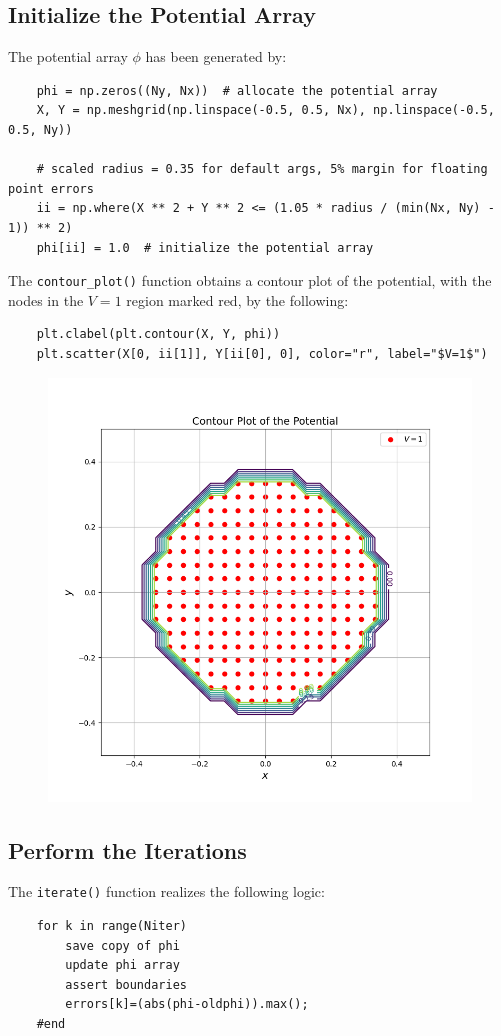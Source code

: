 \documentclass[12pt, a4paper]{article}
\newcommand{\code}{\lstinline[basicstyle=\small]}
\begin{document}
\subsection{Initialize the Potential Array} \label{sec:contour}
The potential array $\phi$ has been generated by:
\begin{lstlisting}
    phi = np.zeros((Ny, Nx))  # allocate the potential array
    X, Y = np.meshgrid(np.linspace(-0.5, 0.5, Nx), np.linspace(-0.5, 0.5, Ny))

    # scaled radius = 0.35 for default args, 5% margin for floating point errors
    ii = np.where(X ** 2 + Y ** 2 <= (1.05 * radius / (min(Nx, Ny) - 1)) ** 2)
    phi[ii] = 1.0  # initialize the potential array   
\end{lstlisting}
The \code{contour_plot()} function obtains a contour plot of the potential,
with the nodes in the $V=1$ region marked red, by the following:
\begin{lstlisting}
    plt.clabel(plt.contour(X, Y, phi))
    plt.scatter(X[0, ii[1]], Y[ii[0], 0], color="r", label="$V=1$")
\end{lstlisting}
\begin{figure}[H]
    \centering
    \includegraphics[scale=0.6]{3.png}
\end{figure}


\subsection{Perform the Iterations}
The \code{iterate()} function realizes the following logic:
\begin{lstlisting}
    for k in range(Niter)
        save copy of phi
        update phi array
        assert boundaries
        errors[k]=(abs(phi-oldphi)).max();
    #end
\end{lstlisting}
\pagebreak
\end{document}
